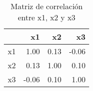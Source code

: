 \begin{table}[ht]
\centering
\begin{tabular}{rrrr}
  \hline
 & x1 & x2 & x3 \\ 
  \hline
x1 & 1.00 & 0.13 & -0.06 \\ 
  x2 & 0.13 & 1.00 & 0.10 \\ 
  x3 & -0.06 & 0.10 & 1.00 \\ 
   \hline
\end{tabular}
\caption{Matriz de correlación entre x1, x2 y x3} 
\end{table}

